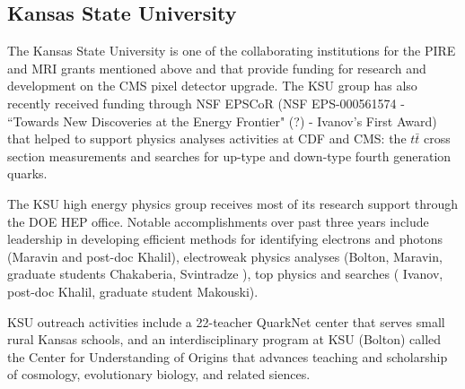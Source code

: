
\subsection{Kansas State University}


The Kansas State University is one of the collaborating institutions for 
the PIRE and MRI grants
mentioned above and that provide funding for research and development on 
the CMS pixel detector upgrade. 
The KSU group has also recently received funding through NSF EPSCoR (NSF 
EPS-000561574 - 
``Towards New Discoveries at the Energy Frontier" (?) - Ivanov's First 
Award) that helped to support 
physics analyses activities at CDF and CMS: the $t\bar{t}$ cross section 
measurements and searches 
for up-type and down-type fourth generation quarks. 

The KSU high energy physics group receives most of its research support 
through the DOE HEP office.
Notable accomplishments over past three years include leadership in 
developing efficient methods 
for identifying electrons and photons (Maravin and post-doc Khalil), 
electroweak 
physics analyses (Bolton, Maravin, graduate students Chakaberia, 
Svintradze ), 
top physics and searches ( Ivanov, post-doc Khalil, graduate student 
Makouski).


KSU outreach activities include a 22-teacher QuarkNet center that serves 
small rural
Kansas schools, and an interdisciplinary program at KSU (Bolton) called 
the Center for Understanding of 
Origins that advances teaching and scholarship of  cosmology, evolutionary 
biology, and related 
siences. 



